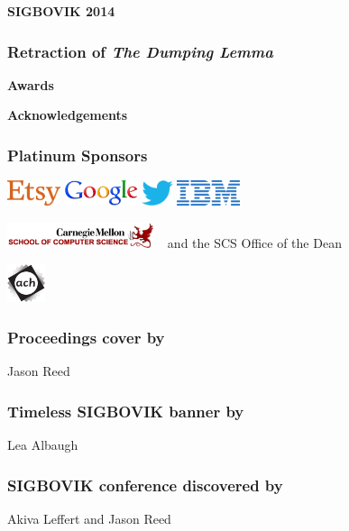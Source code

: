 \documentclass{beamer}
\begin{document}
\begin{frame}
\centering
\Huge \textbf{SIGBOVIK 2014}
\end{frame}

\begin{frame}
\frametitle{Retraction of \emph{The Dumping Lemma}}
\end{frame}

\begin{frame}
\Huge \textbf{Awards}
\end{frame}


\begin{frame}
\Huge \textbf{Acknowledgements}
\end{frame}

\begin{frame}
\frametitle{Platinum Sponsors}
\includegraphics[height=2em]{etsy.png}
\qquad
\includegraphics[height=2em]{google.png}
\qquad
\includegraphics[height=2em]{twitter.png}
\qquad
\includegraphics[height=2em]{ibm.png}
\vspace{1em}

\includegraphics[height=2em]{scs.png}
~ and the SCS Office of the Dean
\vspace{1em}

\includegraphics[height=3em]{ach.png}
\end{frame}

\begin{frame}
\frametitle{Proceedings cover by}
Jason Reed
\end{frame}

\begin{frame}
\frametitle{Timeless SIGBOVIK banner by}
Lea Albaugh
\end{frame}

\begin{frame}
\frametitle{SIGBOVIK conference discovered by}
Akiva Leffert and Jason Reed
\end{frame}
\end{document}
